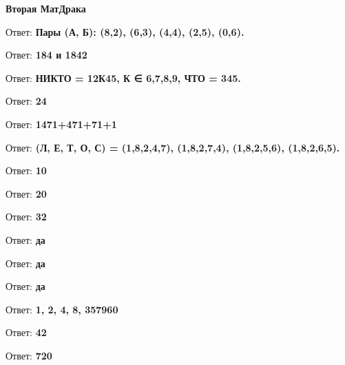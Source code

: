 \centerline{\bf \Huge Вторая МатДрака}

 Ответ: \textbf{Пары (А, Б): (8,2), (6,3), (4,4), (2,5), (0,6).}

 Ответ: \textbf{184 и 1842}

 Ответ: \textbf{НИКТО = 12К45, К ∈ {6,7,8,9}, ЧТО = 345.}

 Ответ: \textbf{24}

 Ответ: \textbf{1471+471+71+1}

 Ответ: \textbf{(Л, Е, Т, О, С) = (1,8,2,4,7), (1,8,2,7,4), (1,8,2,5,6), (1,8,2,6,5).}

 Ответ: \textbf{10}

 Ответ: \textbf{20}

 Ответ: \textbf{32}

 Ответ: \textbf{да}

 Ответ: \textbf{да}

 Ответ: \textbf{да}

 Ответ: \textbf{1, 2, 4, 8, 357960}

 Ответ: \textbf{42}

 Ответ: \textbf{720}

